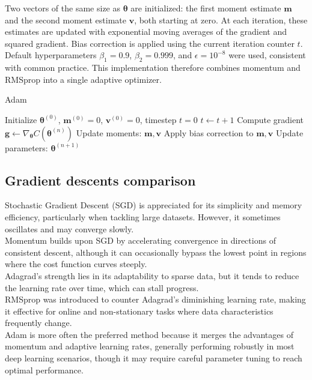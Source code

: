 \documentclass[
 reprint,            %
 amsmath,amssymb,
 aps,
]{revtex4-2}
\begin{document}
Two vectors of the same size as $\boldsymbol{\theta}$ are initialized: the first moment estimate $\mathbf{m}$ and the second moment estimate $\mathbf{v}$, both starting at zero.
At each iteration, these estimates are updated with exponential moving averages of the gradient and squared gradient.
Bias correction is applied using the current iteration counter $t$.
Default hyperparameters $\beta_1=0.9$, $\beta_2=0.999$, and $\epsilon=10^{-8}$ were used, consistent with common practice.
This implementation therefore combines momentum and RMSprop into a single adaptive optimizer.
\begin{algorithm}[H]
\caption{Adam}
\begin{algorithmic}[1]
\State Initialize $\boldsymbol{\theta}^{(0)}$, $\mathbf{m}^{(0)}=0$, $\mathbf{v}^{(0)}=0$, timestep $t=0$
\State $t \gets t+1$
\State Compute gradient $\mathbf{g} \gets \nabla_{\boldsymbol{\theta}} C(\boldsymbol{\theta}^{(n)})$
\State Update moments: $\mathbf{m}, \mathbf{v}$
\State Apply bias correction to $\mathbf{m}, \mathbf{v}$
\State Update parameters: $\boldsymbol{\theta}^{(n+1)}$
\EndFor
\end{algorithmic}
\end{algorithm}

\subsection{Gradient descents comparison}
Stochastic Gradient Descent (SGD) is appreciated for its simplicity and memory efficiency, particularly when tackling large datasets.
However, it sometimes oscillates and may converge slowly.\\
Momentum builds upon SGD by accelerating convergence in directions of consistent descent, although it can occasionally bypass the lowest point in regions where the cost function curves steeply.\\
Adagrad's strength lies in its adaptability to sparse data, but it tends to reduce the learning rate over time, which can stall progress.\\
RMSprop was introduced to counter Adagrad's diminishing learning rate, making it effective for online and non-stationary tasks where data characteristics frequently change.\\
Adam is more often the preferred method because it merges the advantages of momentum and adaptive learning rates, generally performing robustly in most deep learning scenarios, though it may require careful parameter tuning to reach optimal performance\cite{goodfellow2016}.
\end{document}
